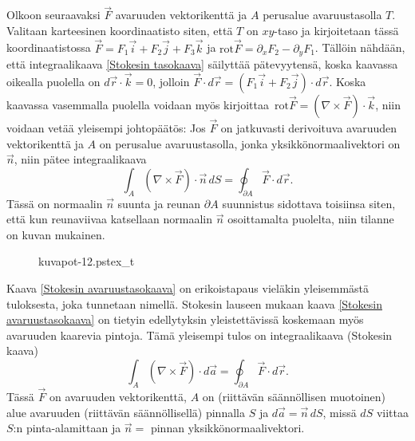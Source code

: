 Olkoon seuraavaksi $\vec F$ avaruuden vektorikenttä ja $A$ perusalue avaruustasolla $T$.
Valitaan karteesinen koordinaatisto siten, että $T$ on $xy$-taso ja kirjoitetaan tässä 
koordinaatistossa $\vec F=F_1\vec i+F_2\vec j+F_3\vec k$ ja 
$\text{rot}\vec F=\partial_x F_2-\partial_y F_1$. Tällöin nähdään, että integraalikaava 
\eqref{Stokesin tasokaava} säilyttää pätevyytensä, koska kaavassa oikealla puolella
on $d\vec r\cdot\vec k=0$, jolloin $\vec F \cdot d\vec r = (F_1\vec i+F_2\vec j) \cdot d\vec r$.
Koska kaavassa vasemmalla puolella voidaan myös kirjoittaa 
$\,\text{rot}\vec F=(\nabla\times\vec F)\cdot\vec k$, niin voidaan vetää yleisempi johtopäätös:
Jos $\vec F$ on jatkuvasti derivoituva avaruuden vektorikenttä ja $A$ on perusalue
avaruustasolla, jonka yksikkönormaalivektori on $\vec n$, niin pätee integraalikaava
\begin{equation} \label{Stokesin avaruustasokaava}
\int_A (\nabla\times\vec F)\cdot\vec n\,dS = \oint_{\partial A} \vec F\cdot d\vec r.
\end{equation}
Tässä on normaalin $\vec n$ suunta ja reunan $\partial A$ suunnistus sidottava toisiinsa siten,
että kun reunaviivaa katsellaan normaalin $\vec n$ osoittamalta puolelta, niin tilanne on kuvan
mukainen.
\begin{figure}[H]
\begin{center}
{kuvapot-12.pstex_t}
\end{center}
\end{figure}
Kaava \eqref{Stokesin avaruustasokaava} on erikoistapaus vieläkin yleisemmästä tuloksesta,
joka tunnetaan \linebreak {}
nimellä. Stokesin lauseen mukaan kaava \eqref{Stokesin avaruustasokaava} on tietyin edellytyksin
yleistettävissä koskemaan myös avaruuden kaarevia pintoja. Tämä yleisempi tulos on
integraalikaava (Stokesin kaava)
\begin{equation} \label{Stokesin avaruuskaava}
\boxed{\quad \int_A (\nabla\times\vec F)\cdot d\vec a
                              =\oint_{\partial A} \vec F\cdot d\vec r. \quad}
\end{equation}
Tässä $\vec F$ on avaruuden vektorikenttä, $A$ on (riittävän säännöllisen muotoinen) alue
avaruuden (riittävän säännöllisellä) pinnalla $S$ ja $d\vec a=\vec n\,dS$, missä $dS$
viittaa $S$:n pinta-alamittaan ja $\vec n=$ pinnan yksikkönormaalivektori.

